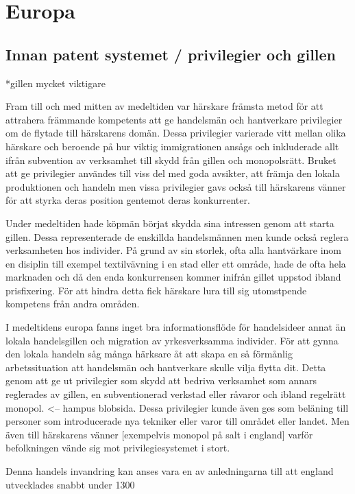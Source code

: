 \section{Europa}

\subsection{Innan patent systemet / privilegier och gillen} %
\label{sub:innan_patent_systemet}
*gillen mycket viktigare

Fram till och med mitten av medeltiden var härskare främsta metod för att attrahera främmande kompetents att ge handelsmän och hantverkare privilegier om de flytade till härskarens domän. Dessa privilegier varierade vitt mellan olika härskare och beroende på hur viktig immigrationen ansågs och inkluderade allt ifrån subvention av verksamhet till skydd från gillen och monopolsrätt. Bruket att ge privilegier användes till viss del med goda avsikter, att främja den lokala produktionen och handeln men vissa privilegier gavs också till härskarens vänner för att styrka deras position gentemot deras konkurrenter.

Under medeltiden hade köpmän börjat skydda sina intressen genom att starta gillen. Dessa representerade de enskillda handelsmännen men kunde också reglera verksamheten hos individer. På grund av sin storlek, ofta alla hantvärkare inom en disiplin till exempel textilvävning i en stad eller ett område, hade de ofta hela marknaden och då den enda konkurrensen kommer inifrån gillet uppstod ibland prisfixering. För att hindra detta fick härskare lura till sig utomstpende kompetens från andra områden.

I medeltidens europa fanns inget bra informationsflöde för handelsideer annat än lokala handelsgillen och migration av yrkesverksamma individer. För att gynna den lokala handeln såg många härksare åt att skapa en så förmånlig arbetssituation att handelsmän och hantverkare skulle vilja flytta dit. Detta genom att ge ut privilegier som skydd att bedriva verksamhet som annars reglerades av gillen, en subventionerad verkstad eller råvaror och ibland regelrätt monopol. <-- hampus blobsida. Dessa privilegier kunde även ges som beläning till personer som introducerade nya tekniker eller varor till området eller landet. Men även till härskarens vänner [exempelvis monopol på salt i england] varför befolkningen vände sig mot privilegiesystemet i stort.

Denna handels invandring kan anses vara en av anledningarna till att england utvecklades snabbt under 1300

